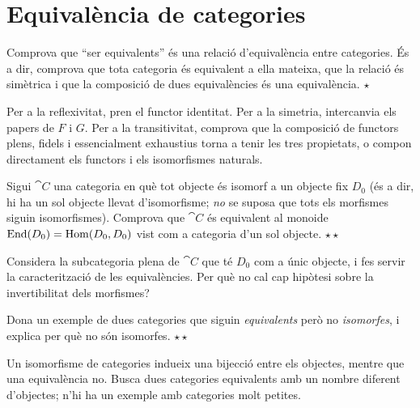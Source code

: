 \section{Equivalència de categories}

\begin{exercici}
Comprova que \enquote{ser equivalents} és una relació d'equivalència entre categories. És a dir, comprova que tota categoria és equivalent a ella mateixa, que la relació és simètrica i que la composició de dues equivalències és una equivalència. \hfill{\normalfont$\star$}
\begin{indicacio}
Per a la reflexivitat, pren el functor identitat. Per a la simetria, intercanvia els papers de $F$ i $G$. Per a la transitivitat, comprova que la composició de functors plens, fidels i essencialment exhaustius torna a tenir les tres propietats, o compon directament els functors i els isomorfismes naturals.
\end{indicacio}
\end{exercici}

\begin{exercici}
Sigui $\cat{C}$ una categoria en què tot objecte és isomorf a un objecte fix $D_0$ (és a dir, hi ha un sol objecte llevat d'isomorfisme; \emph{no} se suposa que tots els morfismes siguin isomorfismes). Comprova que $\cat{C}$ és equivalent al monoide $\mathrm{End}(D_0)=\operatorname{Hom}(D_0,D_0)$ vist com a categoria d'un sol objecte. \hfill{\normalfont$\star\star$}
\begin{indicacio}
Considera la subcategoria plena de $\cat{C}$ que té $D_0$ com a únic objecte, i fes servir la caracterització de les equivalències. Per què no cal cap hipòtesi sobre la invertibilitat dels morfismes?
\end{indicacio}
\end{exercici}

\begin{exercici}
Dona un exemple de dues categories que siguin \emph{equivalents} però no \emph{isomorfes}, i explica per què no són isomorfes. \hfill{\normalfont$\star\star$}
\begin{indicacio}
Un isomorfisme de categories indueix una bijecció entre els objectes, mentre que una equivalència no. Busca dues categories equivalents amb un nombre diferent d'objectes; n'hi ha un exemple amb categories molt petites.
\end{indicacio}
\end{exercici}
